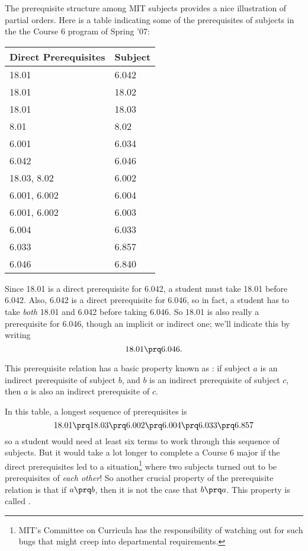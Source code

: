 The prerequisite structure among MIT subjects provides a nice illustration
of partial orders.  Here is a table indicating some of the prerequisites of
subjects in the the Course 6 program of Spring '07:
\begin{center}
\begin{tabular}{|l|l|}
\hline
Direct Prerequisites & Subject\\ \hline
18.01 & 6.042\\ \hline
 18.01 & 18.02\\ \hline
 18.01 & 18.03\\ \hline
 8.01 & 8.02\\ \hline
 6.001 & 6.034\\ \hline
 6.042 & 6.046\\ \hline
 18.03, 8.02 & 6.002\\ \hline
 6.001, 6.002 & 6.004\\ \hline
 6.001, 6.002 & 6.003\\ \hline
 6.004 & 6.033\\ \hline
 6.033 & 6.857\\ \hline
 6.046 & 6.840\\ \hline
\end{tabular}
\end{center}

Since 18.01 is a direct prerequisite for 6.042, a student must take 18.01
before 6.042.  Also, 6.042 is a direct prerequisite for 6.046, so in fact,
a student has to take \emph{both} 18.01 and 6.042 before taking 6.046.  So
18.01 is also really a prerequisite for 6.046, though an implicit or
indirect one; we'll indicate this by writing
\[
18.01 \prq 6.046.
\]

This prerequisite relation has a basic property known as
: if subject $a$ is an indirect prerequisite of
subject $b$, and $b$ is an indirect prerequisite of subject $c$, then
$a$ is also an indirect prerequisite of $c$.

In this table, a longest sequence of prerequisites is
\[
18.01 \prq 18.03 \prq 6.002 \prq 6.004 \prq 6.033 \prq 6.857
\]
so a student would need at least six terms to work through this sequence
of subjects.  But it would take a lot longer to complete a Course 6 major
if the direct prerequisites led to a situation\footnote{MIT's Committee on
Curricula has the responsibility of watching out for such bugs that might
creep into departmental requirements.} where two subjects turned out to be
prerequisites of \emph{each other}!  So another crucial property of the
prerequisite relation is that if $a \prq b$, then it is not the case that
$b \prq a$.  This property is called .

